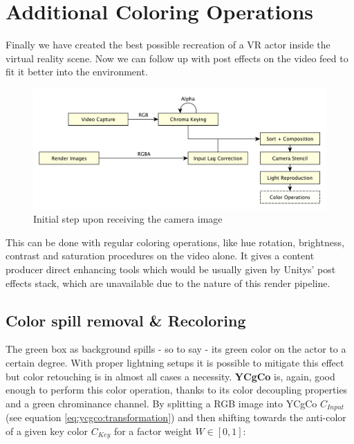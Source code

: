 %
\section{Additional Coloring Operations}

Finally we have created the best possible recreation of a VR actor inside the 
virtual reality scene. Now we can follow up with post effects on the video feed 
to fit it better into the environment.

\begin{figure}[htb]
	\includegraphics[width=\textwidth]{_raw_resources/pipeline_steps/4_8_color.pdf}
	\caption{Initial step upon receiving the camera image}
	\label{fig:steps:recolor}
\end{figure}

This can be done with regular coloring operations, like hue rotation, 
brightness, contrast and saturation procedures on the video alone. It gives a 
content producer direct enhancing tools which would be usually given by Unitys' 
post effects stack, which are unavailable due to the nature of this render 
pipeline.

\subsection{Color spill removal \& Recoloring}

The green box as background spills - so to say - its green color on the actor 
to a certain degree. With proper lightning setups it is possible to mitigate 
this effect but color retouching is in almost all cases a necessity. 
\textbf{YCgCo} is, again, good enough to perform this color operation, thanks 
to its color decoupling properties and a green chrominance channel. By 
splitting a RGB image into YCgCo $C_{Input}$ (see equation 
\eqref{eq:ycgco:transformation}) and then shifting towards the anti-color of a 
given key color $C_{Key}$ for a factor weight $W \in [0, 1]$:

